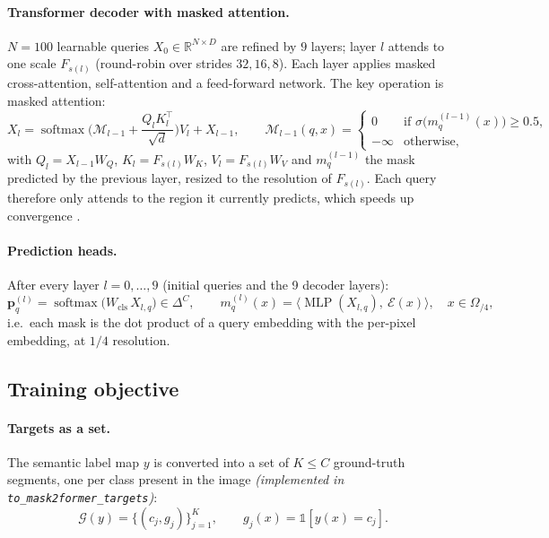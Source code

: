 \documentclass[11pt,a4paper]{article}
\newcommand{\R}{\mathbb{R}}
\newcommand{\1}{\mathbb{1}}
\newcommand{\sg}{\sigma}
\DeclareMathOperator{\softmax}{softmax}
\DeclareMathOperator{\MLP}{MLP}
\begin{document}
\paragraph{Transformer decoder with masked attention.} $N=100$ learnable
queries $X_0\in\R^{N\times D}$ are refined by $9$ layers; layer $l$ attends
to one scale $F_{s(l)}$ (round-robin over strides $32,16,8$). Each layer
applies masked cross-attention, self-attention and a feed-forward network.
The key operation is masked attention:
\[
X_l = \softmax\!\Big(\mathcal{M}_{l-1} + \frac{Q_l K_l^\top}{\sqrt{d}}\Big)V_l + X_{l-1},
\qquad
\mathcal{M}_{l-1}(q,x) =
\begin{cases}
0 & \text{if } \sg\big(m^{(l-1)}_q(x)\big) \ge 0.5,\\
-\infty & \text{otherwise},
\end{cases}
\]
with $Q_l = X_{l-1}W_Q$, $K_l = F_{s(l)}W_K$, $V_l = F_{s(l)}W_V$ and
$m^{(l-1)}_q$ the mask predicted by the previous layer, resized to the
resolution of $F_{s(l)}$. Each query therefore only attends to the region it
currently predicts, which speeds up convergence \cite{cheng2022}.

\paragraph{Prediction heads.} After every layer $l = 0,\dots,9$ (initial
queries and the 9 decoder layers):
\[
\bm p^{(l)}_q = \softmax\big(W_{\text{cls}}\, X_{l,q}\big) \in \Delta^{C},
\qquad
m^{(l)}_q(x) = \big\langle \MLP(X_{l,q}),\ \mathcal{E}(x)\big\rangle,
\quad x\in\Omega_{/4},
\]
i.e.\ each mask is the dot product of a query embedding with the per-pixel
embedding, at $1/4$ resolution.

\subsection{Training objective}

\paragraph{Targets as a set.} The semantic label map $y$ is converted into a
set of $K\le C$ ground-truth segments, one per class present in the image
\emph{(implemented in \texttt{to\_mask2former\_targets})}:
\[
\mathcal{G}(y) = \{(c_j, g_j)\}_{j=1}^{K},\qquad
g_j(x) = \1[y(x)=c_j].
\]
\end{document}
